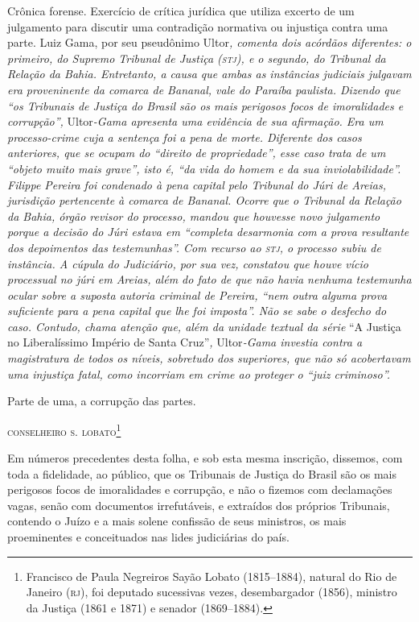 \begin{didascalia}
Crônica forense. Exercício de crítica jurídica que utiliza excerto de um
julgamento para discutir uma contradição normativa ou injustiça contra
uma parte. Luiz Gama, por seu pseudônimo Ultor\emph{, comenta dois
acórdãos diferentes: o primeiro, do Supremo Tribunal de Justiça (\textsc{stj}), e
o segundo, do Tribunal da Relação da Bahia. Entretanto, a causa que
ambas as instâncias judiciais julgavam era proveninente da comarca de
Bananal, vale do Paraíba paulista. Dizendo que ``os Tribunais de Justiça
do Brasil são os mais perigosos focos de imoralidades e corrupção'',}
Ultor\emph{-Gama apresenta uma evidência de sua afirmação. Era um
processo-crime cuja a sentença foi a pena de morte. Diferente dos casos
anteriores, que se ocupam do ``direito de propriedade'', esse caso trata
de um ``objeto muito mais grave'', isto é, ``da vida do homem e da sua
inviolabilidade''. Filippe Pereira foi condenado à pena capital pelo
Tribunal do Júri de Areias, jurisdição pertencente à comarca de Bananal.
Ocorre que o Tribunal da Relação da Bahia, órgão revisor do processo,
mandou que houvesse novo julgamento porque a decisão do Júri estava em
``completa desarmonia com a prova resultante dos depoimentos das
testemunhas''. Com recurso ao \textsc{stj}, o processo subiu de instância. A
cúpula do Judiciário, por sua vez, constatou que houve vício processual
no júri em Areias, além do fato de que não havia nenhuma testemunha
ocular sobre a suposta autoria criminal de Pereira, ``nem outra alguma
prova suficiente para a pena capital que lhe foi imposta''. Não se sabe o
desfecho do caso. Contudo, chama atenção que, além da unidade textual da
série} ``A Justiça no Liberalíssimo Império de Santa Cruz''\emph{,}
Ultor\emph{-Gama investia contra a magistratura de todos os níveis,
sobretudo dos superiores, que não só acobertavam uma injustiça fatal,
como incorriam em crime ao proteger o ``juiz criminoso''.}
\end{didascalia}



Parte de uma, a corrupção das partes.

\textsc{conselheiro s. lobato}\footnote{Francisco de Paula Negreiros Sayão
  Lobato (1815--1884), natural do Rio de Janeiro (\textsc{rj}), foi deputado
  sucessivas vezes, desembargador (1856), ministro da Justiça (1861 e
  1871) e senador (1869--1884).}

Em números precedentes desta folha, e sob esta mesma inscrição,
dissemos, com toda a fidelidade, ao público, que os Tribunais de Justiça
do Brasil são os mais perigosos focos de imoralidades e corrupção, e não
o fizemos com declamações vagas, senão com documentos irrefutáveis, e
extraídos dos próprios Tribunais, contendo o Juízo e a mais solene
confissão de seus ministros, os mais proeminentes e conceituados nas
lides judiciárias do país.

